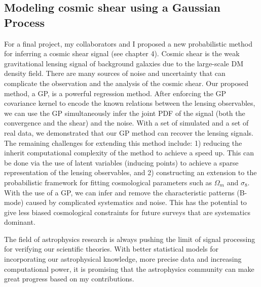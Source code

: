 \subsection{Modeling cosmic shear using a Gaussian Process}
For a final project, my collaborators and I proposed a new probabilistic method
for inferring a cosmic shear signal (see chapter 4). 
Cosmic shear is the weak 
gravitational lensing signal of background galaxies due to the large-scale DM density field. 
There are many sources of noise and uncertainty that can complicate the observation and
the analysis of the cosmic shear. 
Our proposed method, a GP, is a powerful regression method.
After enforcing the GP covariance kernel to encode the known relations between
the lensing observables, 
we can use the GP simultaneously infer the joint PDF of the signal (both the convergence and the shear)
and the noise.  With a set of simulated and a set of real data, we demonstrated that our GP
method can recover the lensing signals.  
The remaining challenges for extending this method include: 1) reducing the
inherit computational complexity of the method to achieve a speed up. This can
be done via the use of latent variables (inducing points) to achieve a sparse representation of
the lensing observables, and 2) constructing an 
extension to the probabilistic 
framework for fitting cosmological parameters such as $\Omega_m$ and
$\sigma_8$.  With the use of a GP, we can infer and remove the characteristic
patterns (B-mode) caused by 
complicated systematics and noise. This has the potential to give less biased 
cosmological constraints for future surveys that are systematics dominant. 

The field of astrophysics research is always pushing the limit of signal
processing for verifying our scientific theories.
With better statistical models for incorporating our astrophysical knowledge, 
more precise data and increasing computational power, it is promising that the
astrophysics community can make great progress based on my contributions.   



